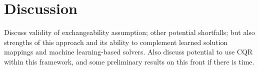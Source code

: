 \documentclass[10pt]{article} %
\theoremstyle{plain}
\theoremstyle{definition}
\theoremstyle{remark}
\begin{document}

\section{Discussion} \label{sec:discussion}

Discuss validity of exchangeability assumption; other potential shortfalls; but also strengths of this approach and its ability to complement learned solution mappings and machine learning-based solvers. Also discuss potential to use CQR within this framework, and some preliminary results on this front if there is time.
\end{document}
